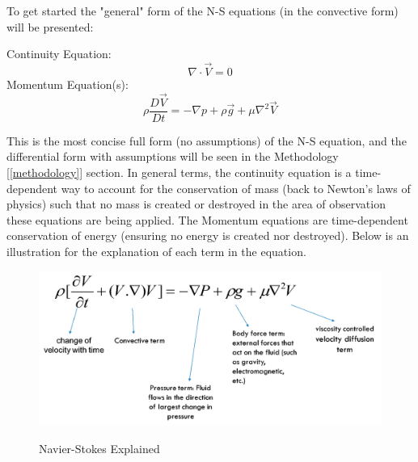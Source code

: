 \documentclass{article}
\begin{document}
	\noindent To get started the "general" form of the N-S equations (in the convective form) will be presented:
	
	\begin{boxA}
		Continuity Equation: 
		\begin{equation}
		    \nabla \cdot \vec{V} = 0
		\end{equation}
		Momentum Equation(s):
		\begin{equation}
		    \rho \frac{D \vec{V}}{Dt} = -\nabla p + \rho \vec{g} + \mu \nabla^2 \vec{V}
		\end{equation}
		
    \end{boxA}
    
    
    This is the most concise full form (no assumptions) of the N-S equation, and the differential form with assumptions will be seen in the Methodology [\ref{methodology}] section. In general terms, the continuity equation is a time-dependent way to account for the conservation of mass (back to Newton's laws of physics) such that no mass is created or destroyed in the area of observation these equations are being applied. The Momentum equations are time-dependent conservation of energy (ensuring no energy is created nor destroyed). Below is an  illustration for the explanation of each term in the equation.
    
    \begin{figure}[htb]
    	\centering
    	\includegraphics[scale=0.25]{./images/f.png}\label{fig:ns_ref}
    	\caption{Navier-Stokes Explained\cite{sim_world_2014} }
    \end{figure}
\end{document}
